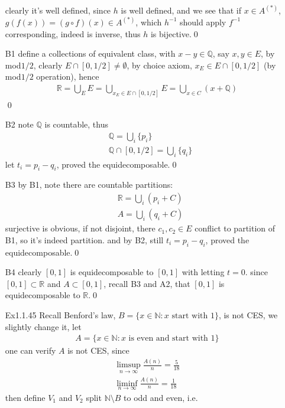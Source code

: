 \documentclass[paper=a4, fontsize=11pt]{scrartcl} %
\numberwithin{equation}{section} %
\numberwithin{figure}{section} %
\numberwithin{table}{section} %
\begin{document}
\begin{itemize}
\begin{align}
	 \end{align}
	 clearly it's well defined, since $h$ is well defined, and we see that if $x\in A^{(*)}$, $g(f(x)) = (g\circ f)(x) \in A^{(*)}$, which $h^{-1}$ should apply $f^{-1}$ corresponding, indeed is inverse, thus $h$ is bijective.\qed
	 \item[B1] define a collections of equivalent class, with $x-y\in \mathbb{Q}$, say $x,y\in E$, by mod$1/2$, clearly $E\cap [0,1/2]\neq \emptyset$, by choice axiom, $x_E\in E\cap [0,1/2]$ (by mod$1/2$ operation), hence
	 \begin{align}
	 	\mathbb{R} = \bigcup_{E} E = \bigcup_{x_E\in E\cap [0,1/2]} E = \bigcup_{x\in C}(x+\mathbb{Q})
	 \end{align}\qed
	 \item[B2] note $\mathbb{Q}$ is countable, thus
	 \begin{align}
	 	&\mathbb{Q} = \bigcup_i \{p_i\} \\
	 	&\mathbb{Q}\cap [0,1/2] = \bigcup_i \{q_i\}
	 \end{align}
	 let $t_i = p_i-q_i$, proved the equidecomposable.\qed
	 \item[B3] by B1, note there are countable partitions:
	 \begin{align}
	 	&\mathbb{R}  =  \bigcup_i (p_i + C)\\
	 	&A = \bigcup_i(q_i+C)
	 \end{align}
	 surjective is obvious, if not disjoint, there $c_1,c_2\in E$ conflict to partition of B1, so it's indeed partition. and by B2, still $t_i=p_i-q_i$, proved the equidecomposable.\qed
	 \item[B4] clearly $[0,1]$ is equidecomposable to $[0,1]$ with letting $t=0$. since $[0,1]\subset \mathbb{R}$ and $A\subset [0,1]$, recall B3 and A2, that $[0,1]$ is equidecomposable to $\mathbb{R}$.\qed
	 \item[Ex1.1.45] Recall Benford's law, $B=\{x\in \mathbb{N}: x \text{ start with 1}\}$, is not CES, we slightly change it, let
	 \begin{align}
	 	A = \{ x\in \mathbb{N}: x\text{ is even and start with 1}\}
	 \end{align}
	 one can verify $A$ is not CES, since
	 \begin{align}
	 	\limsup_{n\rightarrow\infty} \frac{A(n)}{n} = \frac{5}{18} \\
	 	\liminf_{n\rightarrow\infty} \frac{A(n)}{n} = \frac{1}{18}
	 \end{align}
	 then define $V_1$ and $V_2$ split $\mathbb{N}\setminus B$ to odd and even, i.e.

\end{itemize}
\end{document}
